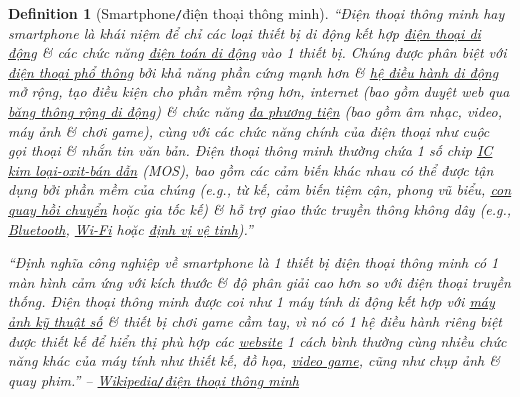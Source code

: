 \documentclass[12pt,twoside]{book}
\newtheorem{definition}{Definition}[section]
\begin{document}
\begin{definition}[Smartphone{\tt/}điện thoại thông minh]
	\label{def: smartphone}
	``\emph{Điện thoại thông minh} hay \emph{smartphone} là khái niệm để chỉ các loại thiết bị di động kết hợp \href{https://vi.wikipedia.org/wiki/%C4%90i%E1%BB%87n_tho%E1%BA%A1i_di_%C4%91%E1%BB%99ng}{điện thoại di động} \& các chức năng \href{https://vi.wikipedia.org/wiki/%C4%90i%E1%BB%87n_to%C3%A1n_di_%C4%91%E1%BB%99ng}{điện toán di động} vào 1 thiết bị. Chúng được phân biệt với \href{https://vi.wikipedia.org/wiki/%C4%90i%E1%BB%87n_tho%E1%BA%A1i_ph%E1%BB%95_th%C3%B4ng}{điện thoại phổ thông} bởi khả năng phần cứng mạnh hơn \& \href{https://vi.wikipedia.org/wiki/H%E1%BB%87_%C4%91i%E1%BB%81u_h%C3%A0nh_di_%C4%91%E1%BB%99ng}{hệ điều hành di động} mở rộng, tạo điều kiện cho phần mềm rộng hơn, internet (bao gồm duyệt web qua \href{https://vi.wikipedia.org/wiki/B%C4%83ng_th%C3%B4ng_r%E1%BB%99ng}{băng thông rộng di động}) \& chức năng \href{https://vi.wikipedia[11pt].org/wiki/%C4%90a_ph%C6%B0%C6%A1ng_ti%E1%BB%87n}{đa phương tiện} (bao gồm âm nhạc, video, máy ảnh \& chơi game), cùng với các chức năng chính của điện thoại như cuộc gọi thoại \& nhắn tin văn bản. Điện thoại thông minh thường chứa 1 số chip \href{https://vi.wikipedia.org/wiki/Vi_m%E1%BA%A1ch}{IC} \href{https://vi.wikipedia.org/wiki/MOSFET}{kim loại-oxit-bán dẫn} (MOS), bao gồm các cảm biến khác nhau có thể được tận dụng bởi phần mềm của chúng (e.g., từ kế, cảm biến tiệm cận, phong vũ biểu, \href{https://vi.wikipedia.org/wiki/Con_quay_h%E1%BB%93i_chuy%E1%BB%83n}{con quay hồi chuyển} hoặc gia tốc kế) \& hỗ trợ giao thức truyền thông không dây (e.g., \href{https://vi.wikipedia.org/wiki/Bluetooth}{Bluetooth}, \href{https://vi.wikipedia.org/wiki/Wi-Fi}{Wi-Fi} hoặc \href{https://vi.wikipedia.org/wiki/GNSS}{định vị vệ tinh}).''
	
	``Định nghĩa công nghiệp về smartphone là 1 thiết bị điện thoại thông minh có 1 màn hình cảm ứng với kích thước \& độ phân giải cao hơn so với điện thoại truyền thống. Điện thoại thông minh được coi như 1 máy tính di động kết hợp với \href{https://vi.wikipedia.org/wiki/M%C3%A1y_%E1%BA%A3nh_s%E1%BB%91}{máy ảnh kỹ thuật số} \& thiết bị chơi game cầm tay, vì nó có 1 hệ điều hành riêng biệt được thiết kế để hiển thị phù hợp các \href{https://vi.wikipedia.org/wiki/Website}{website} 1 cách bình thường cùng nhiều chức năng khác của máy tính như thiết kế, đồ họa, \href{https://vi.wikipedia.org/wiki/Tr%C3%B2_ch%C6%A1i_video}{video game}, cũng như chụp ảnh \& quay phim.'' -- \href{https://vi.wikipedia.org/wiki/%C4%90i%E1%BB%87n_tho%E1%BA%A1i_th%C3%B4ng_minh}{Wikipedia\emph{{\tt/}}điện thoại thông minh}
\end{definition}
\end{document}
